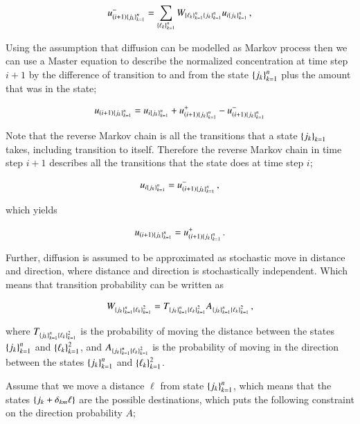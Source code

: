 \documentclass[11pt,english,a4paper]{article}
\begin{document}
\begin{flushleft}
\begin{align}
u_{(i+1)\left\lbrace{j_k}\right\rbrace_{k=1}^n}^- = \sum_{\left\lbrace{\ell_k}\right\rbrace_{k=1}^n} W_{\left\lbrace{\ell_k}\right\rbrace_{k=1}^n\left\lbrace{j_k}\right\rbrace_{k=1}^n} u_{i\left\lbrace{j_k}\right\rbrace_{k=1}^n} \,,
\label{eq_39}
\end{align}

Using the assumption that diffusion can be modelled as Markov process then we can use a Master equation to describe the normalized concentration at time step $i+1$ by the difference of transition to and from the state $\left\lbrace{j_k}\right\rbrace_{k=1}^n$ plus the amount that was in the state; 

\begin{align}
u_{(i+1)\left\lbrace{j_k}\right\rbrace_{k=1}^n} = u_{i\left\lbrace{j_k}\right\rbrace_{k=1}^n} +  u_{(i+1)\left\lbrace{j_k}\right\rbrace_{k=1}^n}^+ - u_{(i+1)\left\lbrace{j_k}\right\rbrace_{k=1}^n}^-
\label{eq_40}
\end{align} 

Note that the reverse Markov chain is all the transitions that a state $\left\lbrace{j_k}\right\rbrace_{k=1}$ takes, including transition to itself. Therefore the reverse Markov chain in time step $i+1$ describes all the transitions that the state does at time step $i$;

\begin{align*}
u_{i\left\lbrace{j_k}\right\rbrace_{k=1}^n} =  u_{(i+1)\left\lbrace{j_k}\right\rbrace_{k=1}^n}^- \,,
\end{align*}


which yields

\begin{align}
u_{(i+1)\left\lbrace{j_k}\right\rbrace_{k=1}^n} = u_{(i+1)\left\lbrace{j_k}\right\rbrace_{k=1}^n}^+ \,.
\label{eq_41}
\end{align}

Further, diffusion is assumed to be approximated as stochastic move in distance and direction, where distance and direction is stochastically independent. Which means that transition probability can be written as

\begin{align}
W_{\left\lbrace{j_k}\right\rbrace_{k=1}^n\left\lbrace{\ell_k}\right\rbrace_{k=1}^2} = T_{\left\lbrace{j_k}\right\rbrace_{k=1}^n\left\lbrace{\ell_k}\right\rbrace_{k=1}^2} A_{\left\lbrace{j_k}\right\rbrace_{k=1}^n\left\lbrace{\ell_k}\right\rbrace_{k=1}^2} \,,
\label{eq_42}
\end{align}

where $T_{\left\lbrace{j_k}\right\rbrace_{k=1}^n\left\lbrace{\ell_k}\right\rbrace_{k=1}^2}$ is the probability of moving the distance between the states $\left\lbrace{j_k}\right\rbrace_{k=1}^n$ and $\left\lbrace{\ell_k}\right\rbrace_{k=1}^2$, and $ A_{\left\lbrace{j_k}\right\rbrace_{k=1}^n\left\lbrace{\ell_k}\right\rbrace_{k=1}^2}$ is the probability of moving in the direction between the states $\left\lbrace{j_k}\right\rbrace_{k=1}^n$ and $\left\lbrace{\ell_k}\right\rbrace_{k=1}^2$. \linebreak

Assume that we move a distance $\ell$ from state $\left\lbrace{j_k}\right\rbrace_{k=1}^n$, which means that the states $\left\lbrace{j_k+\delta_{km}\ell}\right\rbrace$ are the possible destinations, which puts the following constraint on the direction probability $A$;


\end{flushleft}
\end{document}
